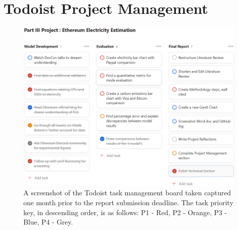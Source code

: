 \chapter{Todoist Project Management}


\begin{figure}[!htb]
    \includegraphics[width=18cm,center]{Figures/Todoist.png}
    \caption*{A screenshot of the Todoist task management board taken captured one month prior to the report submission deadline. The task priority key, in descending order, is as follows: P1 - Red, P2 - Orange, P3 - Blue, P4 - Grey.}
    \label{Figure:Todoist}
\end{figure}